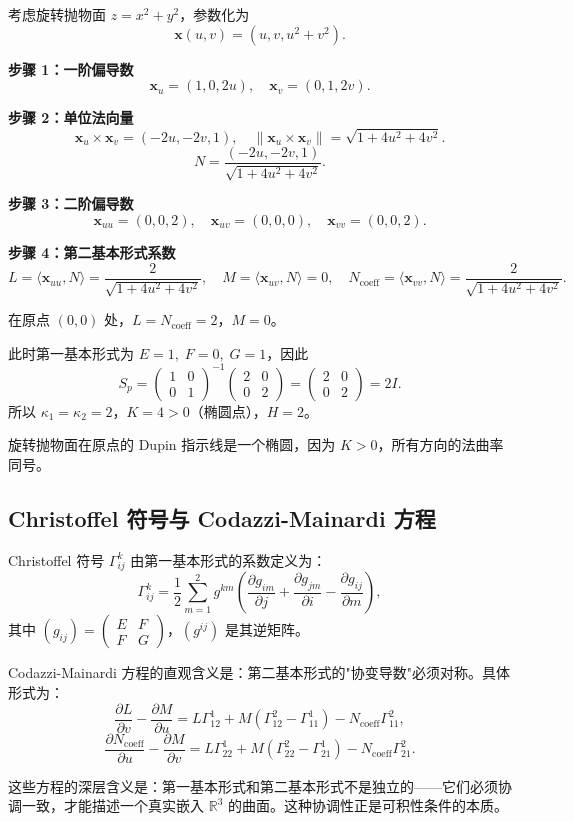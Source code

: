 考虑旋转抛物面 $z = x^2 + y^2$，参数化为
\[
\mathbf{x}(u,v) = (u, v, u^2+v^2).
\]

\textbf{步骤 1：一阶偏导数}
\[
\mathbf{x}_u = (1, 0, 2u),\quad \mathbf{x}_v = (0, 1, 2v).
\]

\textbf{步骤 2：单位法向量}
\[
\mathbf{x}_u \times \mathbf{x}_v = (-2u, -2v, 1),\quad \|\mathbf{x}_u \times \mathbf{x}_v\| = \sqrt{1+4u^2+4v^2}.
\]
\[
N = \frac{(-2u, -2v, 1)}{\sqrt{1+4u^2+4v^2}}.
\tag{A3-3}
\]

\textbf{步骤 3：二阶偏导数}
\[
\mathbf{x}_{uu} = (0, 0, 2),\quad \mathbf{x}_{uv} = (0, 0, 0),\quad \mathbf{x}_{vv} = (0, 0, 2).
\]

\textbf{步骤 4：第二基本形式系数}
\[
L = \langle \mathbf{x}_{uu}, N \rangle = \frac{2}{\sqrt{1+4u^2+4v^2}},\quad
M = \langle \mathbf{x}_{uv}, N \rangle = 0,\quad
N_{\text{coeff}} = \langle \mathbf{x}_{vv}, N \rangle = \frac{2}{\sqrt{1+4u^2+4v^2}}.
\tag{A3-4}
\]

在原点 $(0,0)$ 处，$L = N_{\text{coeff}} = 2$，$M = 0$。

此时第一基本形式为 $E = 1,\; F = 0,\; G = 1$，因此
\[
S_p = \begin{pmatrix} 1 & 0 \\ 0 & 1 \end{pmatrix}^{-1} \begin{pmatrix} 2 & 0 \\ 0 & 2 \end{pmatrix} = \begin{pmatrix} 2 & 0 \\ 0 & 2 \end{pmatrix} = 2I.
\]
所以 $\kappa_1 = \kappa_2 = 2$，$K = 4 > 0$（椭圆点），$H = 2$。

旋转抛物面在原点的 Dupin 指示线是一个椭圆，因为 $K > 0$，所有方向的法曲率同号。

\subsection*{Christoffel 符号与 Codazzi-Mainardi 方程}\label{sec:ch3-christoffel}

Christoffel 符号 $\Gamma_{ij}^k$ 由第一基本形式的系数定义为：
\[
\Gamma_{ij}^k = \frac{1}{2}\sum_{m=1}^{2} g^{km}\left(\frac{\partial g_{im}}{\partial j} + \frac{\partial g_{jm}}{\partial i} - \frac{\partial g_{ij}}{\partial m}\right),
\tag{A3-5}
\]
其中 $(g_{ij}) = \begin{pmatrix} E & F \\ F & G \end{pmatrix}$，$(g^{ij})$ 是其逆矩阵。

Codazzi-Mainardi 方程的直观含义是：第二基本形式的"协变导数"必须对称。具体形式为：
\[
\frac{\partial L}{\partial v} - \frac{\partial M}{\partial u} = L\Gamma_{12}^1 + M(\Gamma_{12}^2 - \Gamma_{11}^1) - N_{\text{coeff}}\Gamma_{11}^2,
\]
\[
\frac{\partial N_{\text{coeff}}}{\partial u} - \frac{\partial M}{\partial v} = L\Gamma_{22}^1 + M(\Gamma_{22}^2 - \Gamma_{21}^1) - N_{\text{coeff}}\Gamma_{21}^2.
\tag{A3-6}
\]

这些方程的深层含义是：第一基本形式和第二基本形式不是独立的——它们必须协调一致，才能描述一个真实嵌入 $\mathbb{R}^3$ 的曲面。这种协调性正是可积性条件的本质。
